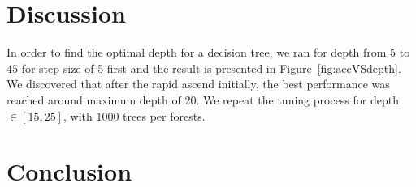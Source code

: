 \documentclass[english,notitlepage,reprint,nofootinbib]{revtex4-1}
\begin{document}
\section{Discussion}\label{sec:discussion}
%
In order to find the optimal depth for a decision tree, we ran for depth from $ 5 $ to $ 45 $ for step size of 5 first and the result is presented in Figure~\ref{fig:accVSdepth}. We discovered that after the rapid ascend initially, the best performance was reached around maximum depth of $ 20 $. We repeat the tuning process for depth $ \in [15, 25] $, with $ 1000 $ trees per forests. 

\section{Conclusion}\label{sec:conclusion}

\onecolumngrid

%

\end{document}
